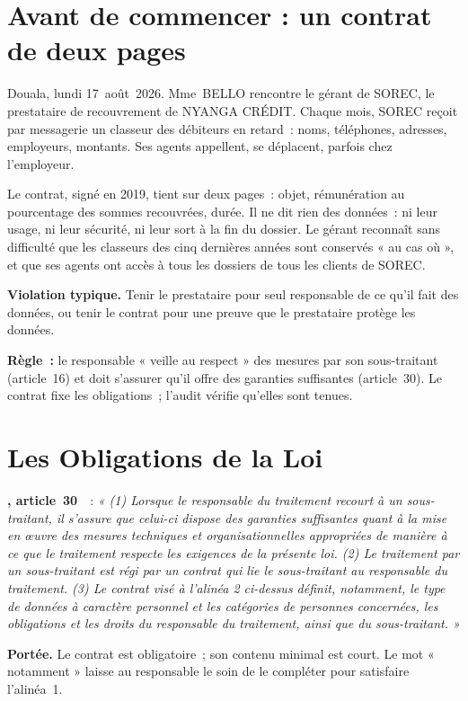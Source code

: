 \section*{Avant de commencer : un contrat de deux pages}

Douala, lundi 17~août~2026. Mme~BELLO rencontre le gérant de SOREC, le
prestataire de recouvrement de NYANGA CRÉDIT. Chaque mois, SOREC reçoit par
messagerie un classeur des débiteurs en retard~: noms, téléphones,
adresses, employeurs, montants. Ses agents appellent, se déplacent,
parfois chez l'employeur.

Le contrat, signé en 2019, tient sur deux pages~: objet, rémunération au
pourcentage des sommes recouvrées, durée. Il ne dit rien des données~:
ni leur usage, ni leur sécurité, ni leur sort à la fin du dossier. Le gérant
reconnaît sans difficulté que les classeurs des cinq dernières années sont
conservés « au cas où », et que ses agents ont accès à tous les dossiers de
tous les clients de SOREC.

\begin{boxalert}
\textbf{Violation typique.} Tenir le prestataire pour seul responsable de ce
qu'il fait des données, ou tenir le contrat pour une preuve que le
prestataire protège les données.

\smallskip
\textbf{Règle~:} le responsable « veille au respect » des mesures par son
sous-traitant (article~16) et doit s'assurer qu'il offre des garanties
suffisantes (article~30). Le contrat fixe les obligations~; l'audit vérifie
qu'elles sont tenues.
\end{boxalert}

\section{Les Obligations de la Loi}
\label{sec:c10-obligations}

\begin{boxjuris}
\textbf{, article~30}~\cite{loi2024017}~:
\textit{« (1) Lorsque le responsable du traitement recourt à un
sous-traitant, il s'assure que celui-ci dispose des garanties suffisantes
quant à la mise en œuvre des mesures techniques et organisationnelles
appropriées de manière à ce que le traitement respecte les exigences de la
présente loi. (2) Le traitement par un sous-traitant est régi par un
contrat qui lie le sous-traitant au responsable du traitement. (3) Le
contrat visé à l'alinéa 2 ci-dessus définit, notamment, le type de données
à caractère personnel et les catégories de personnes concernées, les
obligations et les droits du responsable du traitement, ainsi que du
sous-traitant. »}

\smallskip
\textbf{Portée.} Le contrat est obligatoire~; son contenu minimal est
court. Le mot « notamment » laisse au responsable le soin de le compléter
pour satisfaire l'alinéa~1.
\end{boxjuris}

